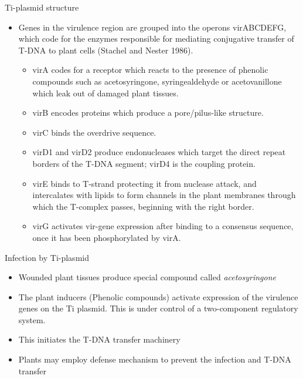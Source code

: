 \documentclass[ignorenonframetext,aspectratio=169]{beamer}
\providecommand{\tightlist}{%
  \setlength{\itemsep}{0pt}\setlength{\parskip}{0pt}}
\begin{document}
\begin{frame}{Ti-plasmid structure}
\protect\hypertarget{ti-plasmid-structure-1}{}

\begin{itemize}
\tightlist
\item
  Genes in the virulence region are grouped into the operons virABCDEFG,
  which code for the enzymes responsible for mediating conjugative
  transfer of T-DNA to plant cells (Stachel and Nester 1986).

  \begin{itemize}
  \tightlist
  \item
    virA codes for a receptor which reacts to the presence of phenolic
    compounds such as acetosyringone, syringealdehyde or acetovanillone
    which leak out of damaged plant tissues.
  \item
    virB encodes proteins which produce a pore/pilus-like structure.
  \item
    virC binds the overdrive sequence.
  \item
    virD1 and virD2 produce endonucleases which target the direct repeat
    borders of the T-DNA segment; virD4 is the coupling protein.
  \item
    virE binds to T-strand protecting it from nuclease attack, and
    intercalates with lipids to form channels in the plant membranes
    through which the T-complex passes, beginning with the right border.
  \item
    virG activates vir-gene expression after binding to a consensus
    sequence, once it has been phosphorylated by virA.
  \end{itemize}
\end{itemize}

\end{frame}

\begin{frame}{Infection by Ti-plasmid}
\protect\hypertarget{infection-by-ti-plasmid}{}

\begin{itemize}
\tightlist
\item
  Wounded plant tissues produce special compound called
  \emph{acetosyringone}
\item
  The plant inducers (Phenolic compounds) activate expression of the
  virulence genes on the Ti plasmid. This is under control of a
  two-component regulatory system.
\item
  This initiates the T-DNA transfer machinery
\item
  Plants may employ defense mechanism to prevent the infection and T-DNA
  transfer
\end{itemize}

\end{frame}
\end{document}
